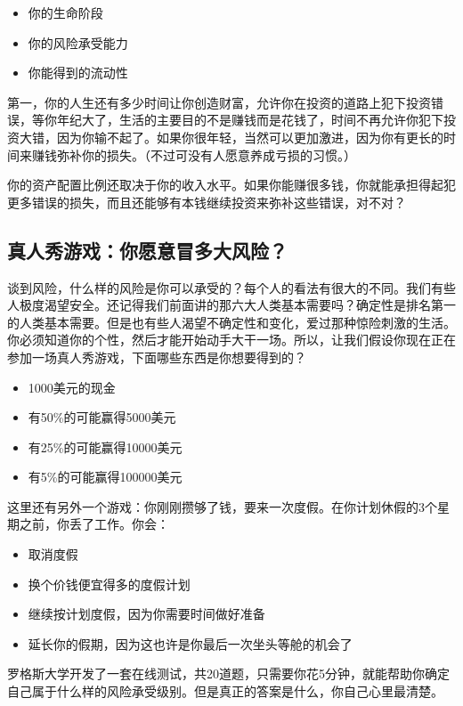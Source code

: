 \begin{itemize}
\item 你的生命阶段
\item 你的风险承受能力
\item 你能得到的流动性
\end{itemize}

第一，你的人生还有多少时间让你创造财富，允许你在投资的道路上犯下投资错误，等你年纪大了，生活的主要目的不是赚钱而是花钱了，时间不再允许你犯下投资大错，因为你输不起了。如果你很年轻，当然可以更加激进，因为你有更长的时间来赚钱弥补你的损失。（不过可没有人愿意养成亏损的习惯。）

你的资产配置比例还取决于你的收入水平。如果你能赚很多钱，你就能承担得起犯更多错误的损失，而且还能够有本钱继续投资来弥补这些错误，对不对？

\subsection{真人秀游戏：你愿意冒多大风险？}

谈到风险，什么样的风险是你可以承受的？每个人的看法有很大的不同。我们有些人极度渴望安全。还记得我们前面讲的那六大人类基本需要吗？确定性是排名第一的人类基本需要。但是也有些人渴望不确定性和变化，爱过那种惊险刺激的生活。你必须知道你的个性，然后才能开始动手大干一场。所以，让我们假设你现在正在参加一场真人秀游戏，下面哪些东西是你想要得到的？

\begin{itemize}
\item 1000美元的现金
\item 有50\%的可能赢得5000美元
\item 有25\%的可能赢得10000美元
\item 有5\%的可能赢得100000美元
\end{itemize}

这里还有另外一个游戏：你刚刚攒够了钱，要来一次度假。在你计划休假的3个星期之前，你丢了工作。你会：

\begin{itemize}
\item 取消度假
\item 换个价钱便宜得多的度假计划
\item 继续按计划度假，因为你需要时间做好准备
\item 延长你的假期，因为这也许是你最后一次坐头等舱的机会了
\end{itemize}

罗格斯大学开发了一套在线测试，共20道题，只需要你花5分钟，就能帮助你确定自己属于什么样的风险承受级别。但是真正的答案是什么，你自己心里最清楚。

